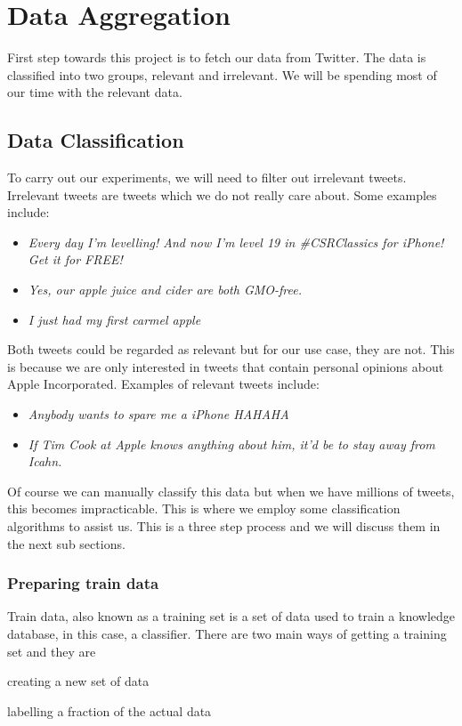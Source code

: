 
\chapter{Data Aggregation}
First step towards this project is to fetch our data from Twitter. The data is classified into two
groups, relevant and irrelevant. We will be spending most of our time with the relevant data.




\section{Data Classification}
To carry out our experiments, we will need to filter out irrelevant tweets. Irrelevant tweets are
tweets which we do not really care about. Some examples include:

\begin{itemize}
  \item \textit{Every day I'm levelling! And now I'm level 19 in \#CSRClassics for iPhone! Get it for FREE!}
  \item \textit{Yes, our apple juice and cider are both GMO-free.}
  \item \textit{I just had my first carmel apple}
\end{itemize}

Both tweets could be regarded as relevant but for our use case, they are not. This is because we are
only interested in tweets that contain personal opinions about Apple Incorporated. Examples of
relevant tweets include:

\begin{itemize}
  \item \textit{Anybody wants to spare me a iPhone HAHAHA}
  \item \textit{If Tim Cook at Apple knows anything about him, it'd be to stay away from Icahn.}
\end{itemize}

Of course we can manually classify this data but when we have millions of tweets, this becomes
impracticable. This is where we employ some classification algorithms to assist us. This is a
three step process and we will discuss them in the next sub sections.

\subsection{Preparing train data}
Train data, also known as a training set is a set of data used to train a knowledge database, in
this case, a classifier. There are two main ways of getting a training set and they are
\begin{enumerate*}
[label=\itshape\alph*\ushape)]
  \item creating a new set of data
  \item labelling a fraction of the actual data
\end{enumerate*}

